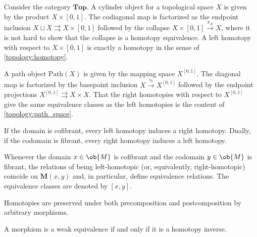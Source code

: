     \begin{example}
        Consider the category $\mathbf{Top}$. A cylinder object for a topological space $X$ is given by the product $X\times[0,1]$. The codiagonal map is factorized as the endpoint inclusion $X\sqcup X\rightrightarrows X\times[0,1]$ followed by the collapse $X\times[0,1]\overset{\pi_X}{\rightarrow}X$, where it is not hard to show that the collapse is a homotopy equivalence. A left homotopy with respect to $X\times[0,1]$ is exactly a homotopy in the sense of \cref{topology:homotopy}.

        A path object $\mathrm{Path}(X)$ is given by the mapping space $X^{[0,1]}$. The diagonal map is factorized by the basepoint inclusion $X\overset{\iota_0}{\rightarrow}X^{[0,1]}$ followed by the endpoint projections $X^{[0,1]}\rightrightarrows X\times X$. That the right homotopies with respect to $X^{[0,1]}$ give the same equivalence classes as the left homotopies is the content of \cref{topology:path_space}.
    \end{example}

    \begin{property}
        If the domain is cofibrant, every left homotopy induces a right homotopy. Dually, if the codomain is fibrant, every right homotopy induces a left homotopy.
    \end{property}
    \begin{result}
        Whenever the domain $x\in\ob{M}$ is cofibrant and the codomain $y\in\ob{M}$ is fibrant, the relations of being left-homotopic (or, equivalently, right-homotopic) coincide on $\mathbf{M}(x,y)$ and, in particular, define equivalence relations. The equivalence classes are denoted by $[x,y]$.
    \end{result}

    \begin{property}
        Homotopies are preserved under both precomposition and postcomposition by arbitrary morphisms.
    \end{property}
    \begin{property}\label{model:weak_equivalence_homotopy}
        A morphism is a weak equivalence if and only if it is a homotopy inverse.
    \end{property}


